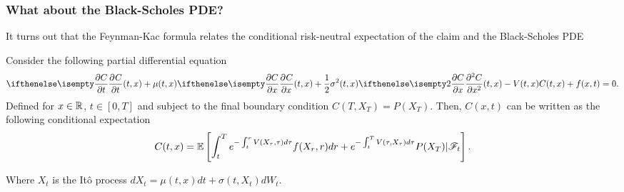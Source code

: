 \documentclass{beamer}
\begin{document}
\begin{frame}
\frametitle{What about the Black-Scholes PDE?}
It turns out that the Feynman-Kac formula relates the conditional risk-neutral expectation of the claim and the Black-Scholes PDE
\begin{theorem}
	Consider the following partial differential equation
	\begin{equation*}
		\partialwrt{C}{t}{(t,x)}	 + \mu(t, x)\partialwrt{C}{x}{(t,x)} + \frac{1}{2}\sigma^2(t,x)\partialwrt[2]{C}{x}{(t,x)}  - V(t,x)C(t,x) + f(x,t) = 0 \label{eq:feynman_kac_pde}.
	\end{equation*}
	Defined for $x\in\mathbb{R}$, $t\in[0,T]$ and subject to the final boundary condition $C(T, X_T) = P(X_T)$. Then, $C(x,t)$ can be written as the following conditional expectation
	\begin{equation}
	C(t, x) = \mathbb{E}\left[\int_t^Te^{-\int_t^r V(X_\tau, \tau) d\tau} f(X_r, r) dr + e^{-\int_t^TV(\tau, X_\tau) d\tau} P(X_T)| \mathscr{F}_t\right].
	\end{equation}

Where $X_t$ is the It\^o process $dX_t = \mu(t,x) dt + \sigma(t, X_t) dW_t$.
\end{theorem}

\end{frame}

%
\end{document}
